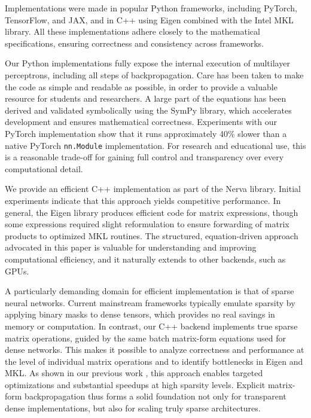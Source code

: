 \documentclass[twoside,11pt]{article}
\begin{document}
Implementations were made in popular Python frameworks, including PyTorch, TensorFlow, and JAX,
and in C++ using Eigen combined with the Intel MKL library.
All these implementations adhere closely to the mathematical specifications,
ensuring correctness and consistency across frameworks.

Our Python implementations fully expose the internal execution of multilayer perceptrons, including all steps of backpropagation. Care has been taken to make the code as simple and readable as possible, in order to provide a valuable resource for students and researchers. A large part of the equations has been derived and validated symbolically using the SymPy library, which accelerates development and ensures mathematical correctness. Experiments with our PyTorch implementation show that it runs approximately 40\% slower than a native PyTorch \texttt{nn.Module} implementation.
For research and educational use, this is a reasonable trade-off for gaining full control and transparency over every computational detail.

We provide an efficient C++ implementation as part of the Nerva library.
Initial experiments indicate that this approach yields competitive performance.
In general, the Eigen library produces efficient code for matrix expressions,
though some expressions required slight reformulation to ensure forwarding
of matrix products to optimized MKL routines. The structured, equation-driven approach advocated in this paper is valuable for understanding and improving computational efficiency, and it naturally extends to other backends, such as GPUs.

A particularly demanding domain for efficient implementation is that of sparse neural networks. Current mainstream frameworks typically emulate sparsity by applying binary masks to dense tensors, which provides no real savings in memory or computation.
In contrast, our C++ backend implements true sparse matrix operations, guided by the same batch matrix-form equations used for dense networks. This makes it possible to analyze correctness and performance at the level of individual matrix operations and to identify bottlenecks in Eigen and MKL. As shown in our previous work \citep{wesselink2024nervatrulysparseimplementation}, this approach enables targeted optimizations and substantial speedups at high sparsity levels. Explicit matrix-form backpropagation thus forms a solid foundation not only for transparent dense
implementations, but also for scaling truly sparse architectures.
\end{document}
